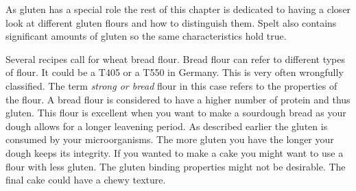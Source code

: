 \begin{table}[]
  \centering
  \caption{An overview of different grain types and the steps involved in the respective bread making process}
\end{table}


As gluten has a special role the rest of this chapter is dedicated to having a
closer look at different gluten flours and how to distinguish them. Spelt
also contains significant amounts of gluten so the same characteristics hold
true.

Several recipes call for wheat bread flour. Bread flour can refer to different types
of flour. It could be a T405 or a T550 in Germany. This is very often
wrongfully classified. The term  \textit{strong or bread} flour in this case
refers to the properties of the flour. A bread flour is considered to have a
higher number of protein and thus gluten. This flour is excellent when you
want to make a sourdough bread as your dough allows for a longer leavening
period. As described earlier the gluten is consumed by your microorganisms.
The more gluten you have the longer your dough keeps its integrity. If you wanted
to make a cake you might want to use a flour with less gluten. The gluten binding
properties might not be desirable. The final cake could have a chewy texture.

